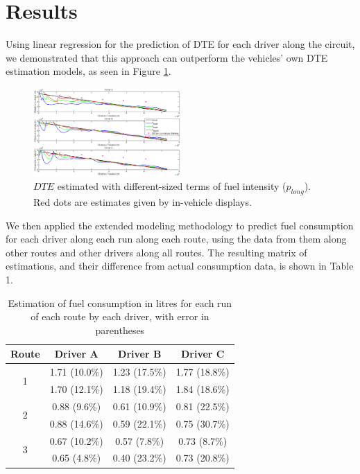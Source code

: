 \section{Results}

Using linear regression for the prediction of DTE for each driver along the circuit, we demonstrated that this approach can outperform the vehicles' own DTE estimation models, as seen in Figure \ref{fig:dte}.

\begin{figure}[!htb]
\centering
    \includegraphics[width=0.5\textwidth]{figs/acmdte}
\caption{\(DTE\) estimated with different-sized terms of fuel intensity (\(p_{long}\)). Red dots are estimates given by in-vehicle displays.}
 \label{fig:dte}
\end{figure}

We then applied the extended modeling methodology to predict fuel consumption for each driver along each run along each route, using the data from them along other routes and other drivers along all routes. The resulting matrix of estimations, and their difference from actual consumption data, is shown in Table 1.

\begin{table}
\label{tab:est}
  \centering
  \begin{tabular}{|c|c|c|c|}
\hline
    Route & Driver A & Driver B & Driver C \\
\hline
\multirow{2}{*}{1} & 1.71 (10.0\%) & 1.23 (17.5\%) & 1.77 (18.8\%)\\
& 1.70 (12.1\%) & 1.18 (19.4\%) & 1.84 (18.6\%)\\
\hline
\multirow{2}{*}{2} & 0.88 (9.6\%) & 0.61 (10.9\%) & 0.81 (22.5\%)
\\
& 0.88 (14.6\%) & 0.59 (22.1\%) & 0.75 (30.7\%)
\\
\hline
\multirow{2}{*}{3} & 0.67 (10.2\%) & 0.57 (7.8\%) & 0.73 (8.7\%)
\\
& 0.65 (4.8\%) & 0.40 (23.2\%) & 0.73 (20.8\%)
\\
\hline
  \end{tabular}
  \caption{Estimation of fuel consumption in litres for each run of each route by each driver, with error in parentheses}
\end{table}
